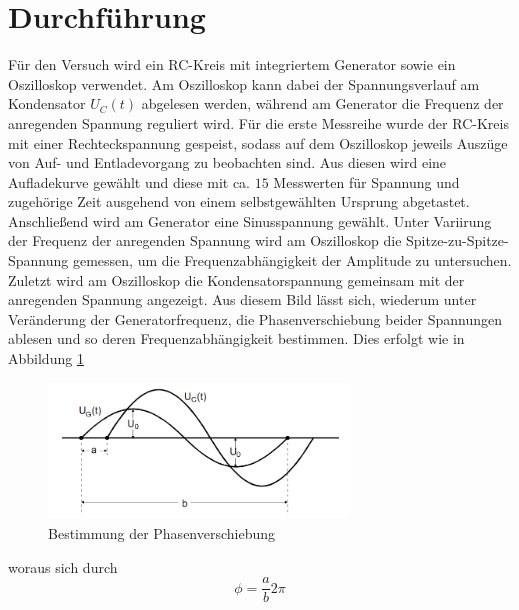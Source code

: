 \section{Durchführung}
Für den Versuch wird ein RC-Kreis mit integriertem Generator sowie ein Oszilloskop verwendet. Am Oszilloskop kann dabei der
Spannungsverlauf am Kondensator $U_C(t)$ abgelesen werden, während am Generator die Frequenz der anregenden Spannung reguliert wird.
Für die erste Messreihe wurde der RC-Kreis mit einer Rechteckspannung gespeist, sodass auf dem Oszilloskop jeweils Auszüge von Auf- und Entladevorgang 
zu beobachten sind. Aus diesen wird eine Aufladekurve gewählt und diese mit ca. $15$ Messwerten für Spannung und zugehörige Zeit ausgehend von einem 
selbstgewählten Ursprung abgetastet. \\
Anschließend wird am Generator eine Sinusspannung gewählt. Unter Variirung der Frequenz der anregenden Spannung wird am Oszilloskop
die Spitze-zu-Spitze-Spannung gemessen, um die Frequenzabhängigkeit der Amplitude zu untersuchen. \\
Zuletzt wird am Oszilloskop die Kondensatorspannung gemeinsam mit der anregenden Spannung angezeigt. Aus diesem Bild lässt sich, wiederum
unter Veränderung der Generatorfrequenz, die Phasenverschiebung beider Spannungen ablesen und so deren Frequenzabhängigkeit bestimmen.
Dies erfolgt wie in Abbildung \ref{fig:Phasenverschiebung} 
\begin{figure}
\centering
\includegraphics[width=8cm, keepaspectratio]{Phasenverschiebung}
\caption{Bestimmung der Phasenverschiebung}
\label{fig:Phasenverschiebung}
\end{figure}
woraus sich durch
\begin{equation}
\phi=\frac{a}{b}2\pi
\end{equation}
